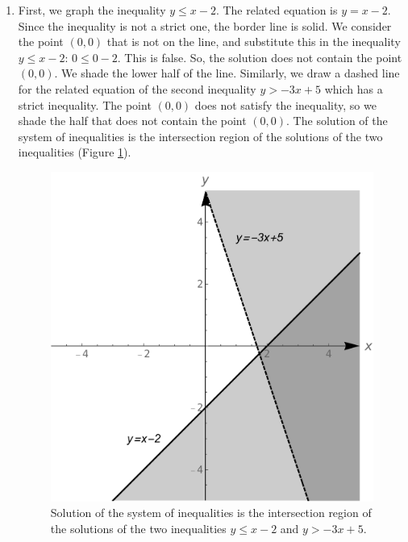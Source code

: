 \begin{example}
\begin{enumerate}
\item First, we graph the inequality  $y \leq x-2$. The related equation is $y=x-2$. Since the inequality is not a strict one, the border line is solid. We consider the point $(0,0)$ that is not on the line, and substitute this in the inequality $y \leq x-2$: $0 \leq 0-2 $. This is false. So, the solution does not contain the point $(0,0)$. We shade the lower half of the line. Similarly, we draw a dashed line for the related equation of the second inequality $y > -3x+5$ which has a strict inequality. The point $(0,0)$ does not satisfy the inequality, so we shade the half that does not contain the point $(0,0)$. 
The solution of the system of inequalities is the intersection region of the solutions of the two inequalities (Figure \ref{fig_Systems_lin_eq_6}).
\begin{figure}[H]
	\centering
	\includegraphics[scale=0.4]{fig_Systems_lin_eq_6}
	\caption{Solution of the system of inequalities is the intersection region of the solutions of the two inequalities $y \leq x-2$ and $y > -3x+5$.}
	\label{fig_Systems_lin_eq_6}
\end{figure}


\end{enumerate}
\end{example}
